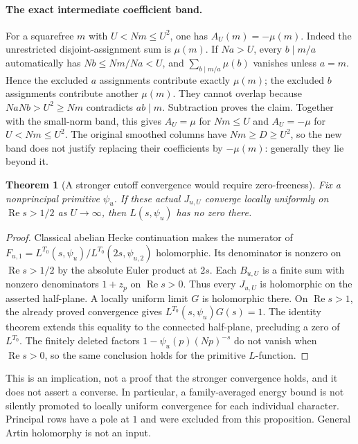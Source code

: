 \documentclass[11pt,oneside,openany]{book}
\newtheorem{theorem}{Theorem}[chapter]
\theoremstyle{definition}\newtheorem{definition}[theorem]{Definition}
\theoremstyle{remark}\newtheorem{remark}[theorem]{Remark}
\begin{document}
\paragraph{The exact intermediate coefficient band.}
For a squarefree $m$ with $U<Nm\le U^2$, one has $A_U(m)=-\mu(m)$.
Indeed the unrestricted disjoint-assignment sum is $\mu(m)$. If $Na>U$,
every $b\mid m/a$ automatically has $Nb\le Nm/Na<U$, and
$\sum_{b\mid m/a}\mu(b)$ vanishes unless $a=m$. Hence the excluded
$a$ assignments contribute exactly $\mu(m)$; the excluded $b$
assignments contribute another $\mu(m)$. They cannot overlap because
$NaNb>U^2\ge Nm$ contradicts $ab\mid m$. Subtraction proves the claim.
Together with the small-norm band, this gives $A_U=\mu$ for $Nm\le U$
and $A_U=-\mu$ for $U<Nm\le U^2$. The original smoothed columns have
$Nm\ge D\ge U^2$, so the new band does not justify replacing their
coefficients by $-\mu(m)$: generally they lie beyond it.

\begin{theorem}[A stronger cutoff convergence would require zero-freeness]
\label{rc:boundary}
Fix a nonprincipal primitive $\psi_u$. If these actual $J_{u,U}$
converge locally uniformly on $\operatorname{Re}s>1/2$ as
$U\longrightarrow\infty$, then $L(s,\psi_u)$ has no zero there.
\end{theorem}
\begin{proof}
Classical abelian Hecke continuation makes the numerator of
$F_{u,1}=L^{T_0}(s,\psi_u)/L^{T_0}(2s,\psi_{u,2})$ holomorphic.
Its denominator is nonzero on $\operatorname{Re}s>1/2$ by the
absolute Euler product at $2s$. Each $B_{u,U}$ is a finite sum with
nonzero denominators $1+z_p$ on $\operatorname{Re}s>0$.
Thus every $J_{u,U}$ is holomorphic on the asserted half-plane.
A locally uniform limit $G$ is holomorphic there. On
$\operatorname{Re}s>1$, the already proved convergence gives
$L^{T_0}(s,\psi_u)G(s)=1$. The identity theorem extends this equality
to the connected half-plane, precluding a zero of $L^{T_0}$.
The finitely deleted factors $1-\psi_u(p)(Np)^{-s}$ do not vanish
when $\operatorname{Re}s>0$, so the same conclusion holds for the
primitive $L$-function.
\end{proof}
This is an implication, not a proof that the stronger convergence holds,
and it does not assert a converse. In particular, a family-averaged energy
bound is not silently promoted to locally uniform convergence for each
individual character. Principal rows have a pole at $1$ and were excluded
from this proposition. General Artin holomorphy is not an input.
\end{document}
